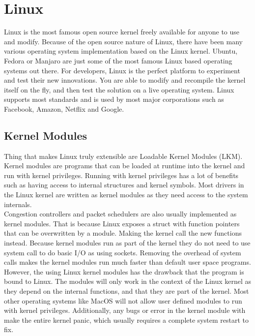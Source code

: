 \documentclass[a4paper,english, 11pt]{report}
\begin{document}
\section{Linux}

Linux is the most famous open source kernel freely available for anyone to use and modify. Because of the open source nature of Linux, there have been many various operating system implementation based on the Linux kernel. Ubuntu, Fedora or Manjaro are just some of the most famous Linux based operating systems out there. For developers, Linux is the perfect platform to experiment and test their new innovations. You are able to modify and recompile the kernel itself on the fly, and then test the solution on a live operating system. Linux supports most standards and is used by most major corporations such as Facebook, Amazon, Netflix and Google.

\subsection{Kernel Modules}
Thing that makes Linux truly extensible are Loadable Kernel Modules (LKM). Kernel modules are programs that can be loaded at runtime into the kernel and run with kernel privileges. Running with kernel privileges has a lot of benefits such as having access to internal structures and kernel symbols. Most drivers in the Linux kernel are written as kernel modules as they need access to the system internals.\\

Congestion controllers and packet schedulers are also usually implemented as kernel modules. That is because Linux exposes a struct with function pointers that can be overwritten by a module. Making the kernel call the new functions instead. Because kernel modules run as part of the kernel they do not need to use system call to do basic I/O as using sockets. Removing the overhead of system calls makes the kernel modules run much faster than default user space programs.\\

However, the using Linux kernel modules has the drawback that the program is bound to Linux. The modules will only work in the context of the Linux kernel as they depend on the internal functions, and that they are part of the kernel. Most other operating systems like MacOS will not allow user defined modules to run with kernel privileges. Additionally, any bugs or error in the kernel module with make the entire kernel panic, which usually requires a complete system restart to fix.
\end{document}
